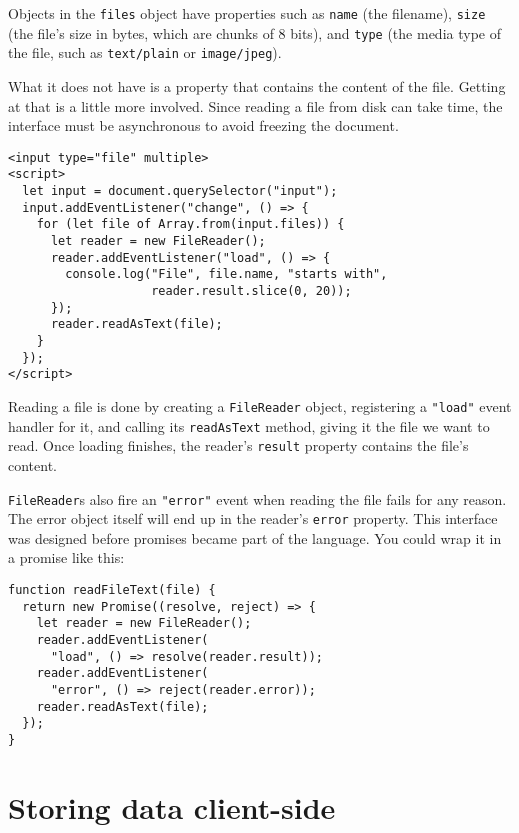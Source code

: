 Objects in the \lstinline`files` object have properties such as \lstinline`name` (the filename), \lstinline`size` (the file's size in bytes, which are chunks of 8 bits), and \lstinline`type` (the media type of the file, such as \lstinline`text/plain` or \lstinline`image/jpeg`).

\label{http.filereader}What it does not have is a property that contains the content of the file. Getting at that is a little more involved. Since reading a file from disk can take time, the interface must be asynchronous to avoid freezing the document.

\begin{lstlisting}
<input type="file" multiple>
<script>
  let input = document.querySelector("input");
  input.addEventListener("change", () => {
    for (let file of Array.from(input.files)) {
      let reader = new FileReader();
      reader.addEventListener("load", () => {
        console.log("File", file.name, "starts with",
                    reader.result.slice(0, 20));
      });
      reader.readAsText(file);
    }
  });
</script>
\end{lstlisting}
\noindent{}

Reading a file is done by creating a \lstinline`FileReader` object, registering a \lstinline`"load"` event handler for it, and calling its \lstinline`readAsText` method, giving it the file we want to read. Once loading finishes, the reader's \lstinline`result` property contains the file's content.

\lstinline`FileReader`s also fire an \lstinline`"error"` event when reading the file fails for any reason. The error object itself will end up in the reader's \lstinline`error` property. This interface was designed before promises became part of the language. You could wrap it in a promise like this:

\begin{lstlisting}
function readFileText(file) {
  return new Promise((resolve, reject) => {
    let reader = new FileReader();
    reader.addEventListener(
      "load", () => resolve(reader.result));
    reader.addEventListener(
      "error", () => reject(reader.error));
    reader.readAsText(file);
  });
}
\end{lstlisting}
\noindent

\section{Storing data client-side}

